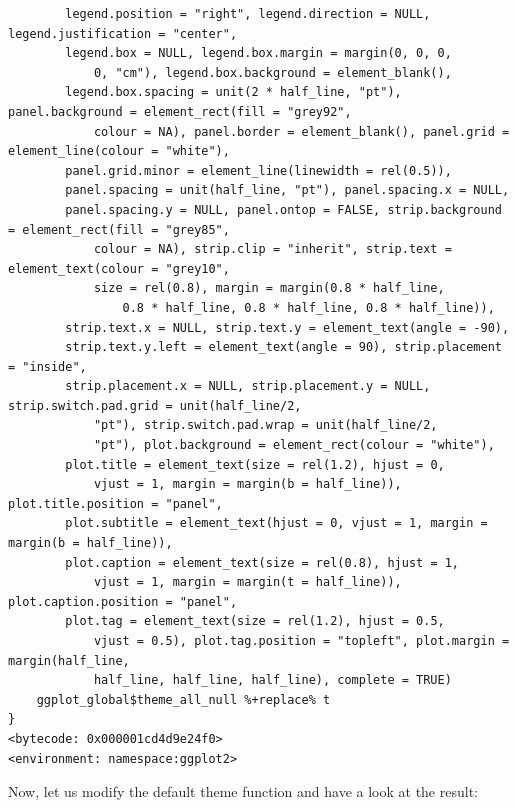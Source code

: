 \documentclass[
  letterpaper,
]{scrbook}
\begin{document}
\begin{verbatim}
        legend.position = "right", legend.direction = NULL, legend.justification = "center", 
        legend.box = NULL, legend.box.margin = margin(0, 0, 0, 
            0, "cm"), legend.box.background = element_blank(), 
        legend.box.spacing = unit(2 * half_line, "pt"), panel.background = element_rect(fill = "grey92", 
            colour = NA), panel.border = element_blank(), panel.grid = element_line(colour = "white"), 
        panel.grid.minor = element_line(linewidth = rel(0.5)), 
        panel.spacing = unit(half_line, "pt"), panel.spacing.x = NULL, 
        panel.spacing.y = NULL, panel.ontop = FALSE, strip.background = element_rect(fill = "grey85", 
            colour = NA), strip.clip = "inherit", strip.text = element_text(colour = "grey10", 
            size = rel(0.8), margin = margin(0.8 * half_line, 
                0.8 * half_line, 0.8 * half_line, 0.8 * half_line)), 
        strip.text.x = NULL, strip.text.y = element_text(angle = -90), 
        strip.text.y.left = element_text(angle = 90), strip.placement = "inside", 
        strip.placement.x = NULL, strip.placement.y = NULL, strip.switch.pad.grid = unit(half_line/2, 
            "pt"), strip.switch.pad.wrap = unit(half_line/2, 
            "pt"), plot.background = element_rect(colour = "white"), 
        plot.title = element_text(size = rel(1.2), hjust = 0, 
            vjust = 1, margin = margin(b = half_line)), plot.title.position = "panel", 
        plot.subtitle = element_text(hjust = 0, vjust = 1, margin = margin(b = half_line)), 
        plot.caption = element_text(size = rel(0.8), hjust = 1, 
            vjust = 1, margin = margin(t = half_line)), plot.caption.position = "panel", 
        plot.tag = element_text(size = rel(1.2), hjust = 0.5, 
            vjust = 0.5), plot.tag.position = "topleft", plot.margin = margin(half_line, 
            half_line, half_line, half_line), complete = TRUE)
    ggplot_global$theme_all_null %+replace% t
}
<bytecode: 0x000001cd4d9e24f0>
<environment: namespace:ggplot2>
\end{verbatim}

Now, let us modify the default theme function and have a look at the
result:
\end{document}
